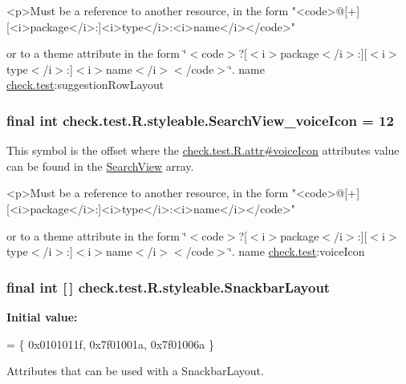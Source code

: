 \begin{DoxyVerb}      <p>Must be a reference to another resource, in the form "<code>@[+][<i>package</i>:]<i>type</i>:<i>name</i></code>"
\end{DoxyVerb}
 or to a theme attribute in the form \char`\"{}$<$code$>$?\mbox{[}$<$i$>$package$<$/i$>$\+:\mbox{]}\mbox{[}$<$i$>$type$<$/i$>$\+:\mbox{]}$<$i$>$name$<$/i$>$$<$/code$>$\char`\"{}.  name \hyperlink{namespacecheck_1_1test}{check.\+test}\+:suggestion\+Row\+Layout \hypertarget{classcheck_1_1test_1_1_r_1_1styleable_acb56cf2aa22fa1d1f6c6bfeed93c46e3}{}
\subsubsection[{Search\+View\+\_\+voice\+Icon}]{\setlength{\rightskip}{0pt plus 5cm}final int check.\+test.\+R.\+styleable.\+Search\+View\+\_\+voice\+Icon = 12\hspace{0.3cm}{\ttfamily [static]}}\label{classcheck_1_1test_1_1_r_1_1styleable_acb56cf2aa22fa1d1f6c6bfeed93c46e3}
This symbol is the offset where the \hyperlink{classcheck_1_1test_1_1_r_1_1attr_acbef98ffd0298aff57e4df6b3265f2f5}{check.\+test.\+R.\+attr\#voice\+Icon} attribute\textquotesingle{}s value can be found in the \hyperlink{classcheck_1_1test_1_1_r_1_1styleable_af133609668e9a4263b21387e9a7574f8}{Search\+View} array.

\begin{DoxyVerb}      <p>Must be a reference to another resource, in the form "<code>@[+][<i>package</i>:]<i>type</i>:<i>name</i></code>"
\end{DoxyVerb}
 or to a theme attribute in the form \char`\"{}$<$code$>$?\mbox{[}$<$i$>$package$<$/i$>$\+:\mbox{]}\mbox{[}$<$i$>$type$<$/i$>$\+:\mbox{]}$<$i$>$name$<$/i$>$$<$/code$>$\char`\"{}.  name \hyperlink{namespacecheck_1_1test}{check.\+test}\+:voice\+Icon \hypertarget{classcheck_1_1test_1_1_r_1_1styleable_ad7fc8f60242ddfaa068c43f614e1ff65}{}
\subsubsection[{Snackbar\+Layout}]{\setlength{\rightskip}{0pt plus 5cm}final int \mbox{[}$\,$\mbox{]} check.\+test.\+R.\+styleable.\+Snackbar\+Layout\hspace{0.3cm}{\ttfamily [static]}}\label{classcheck_1_1test_1_1_r_1_1styleable_ad7fc8f60242ddfaa068c43f614e1ff65}
{\bfseries Initial value\+:}
\begin{DoxyCode}
= \{
            0x0101011f, 0x7f01001a, 0x7f01006a
        \}
\end{DoxyCode}
Attributes that can be used with a Snackbar\+Layout. 

